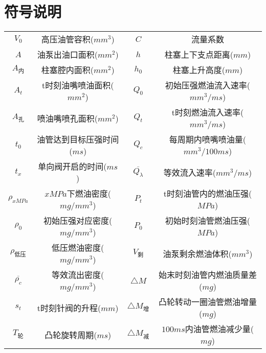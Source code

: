 \documentclass[withoutpreface,bwprint]{cumcmthesis} %
\begin{document}
\section{符号说明}
\begin{center}
	\begin{tabular}{cc|cc}
		\toprule
		\makebox[0.05\textwidth][c]{符号}	&  \makebox[0.2\textwidth][c]{意义}  & \makebox[0.05\textwidth][c]{符号}	&  \makebox[0.2\textwidth][c]{意义} \\
		\midrule
		$V_{0}$	  & 高压油管容积($mm^{3}$)                        & 
		$C$       & 流量系数                                     \\
		$A$       & 油泵出油口面积($mm^{2}$)                   &
		$h$       & 柱塞上下支点距离($mm$)                            \\
		$A_{\text{内}}$ & 柱塞腔内面积($mm^{2}$)           &
		$h_{0}$   & 柱塞上升高度($mm$)                          \\
		$A_{t}$       & t时刻油嘴喷油面积($mm^{2}$)           &
		$Q_{0}$   & 初始压强燃油流入速率($mm^{3}/ms$)              \\
		$A_{\text{孔}}$       & 喷油嘴喷孔面积($mm^{2}$)            & 
		$Q_{t}$   & t时刻燃油流入速率($mm^{3}/ms$)                  \\
		$t_{0}$   & 油管达到目标压强时间($ms$)                  &
		$Q_{c}$   & 每周期内喷嘴喷油量($mm^{3}/100ms$)           \\
		$t_{x}$   & 单向阀开启的时间($ms$)                          &
		$\overline{Q_{\lambda}}$    & 等效流入速率($mm^{3}/ms$)     \\
		$\rho_{xMPa}$   & $xMPa$下燃油密度($mg/mm^{3}$)       &
		$P_{t}$   & t时刻油管内的燃油压强($MPa$)                 \\
		$\rho_{0}$   & 初始压强对应密度($mg/mm^{3}$)                &
		$P_{0}$   & 初始时刻油管燃油压强($MPa$)                  \\
		$\rho_{\text{低压}}$   & 低压燃油密度($mg/mm^{3}$)           &
		$V_{\text{剩}}$   & 油泵剩余燃油体积($mm^{3}$)                  \\
		$\overline{\rho_{c}}$   & 等效流出密度($mg/mm^{3}$)         &
		${\triangle M}$   & 始末时刻油管内燃油质量差($mg$)           \\
		$s_{t}$   & t时刻针阀的升程($mm$)                            &
		${\triangle M_{\text{增}}}$   & 凸轮转动一圈油管燃油增量($mg$)                     \\
		${T_{\text{轮}}}$   & 凸轮旋转周期($ms$)                     &
		${\triangle M_{\text{减}}}$   & $100ms$内油管燃油减少量($mg$)                     \\	
		\bottomrule
	\end{tabular}
\end{center}
\end{document}
